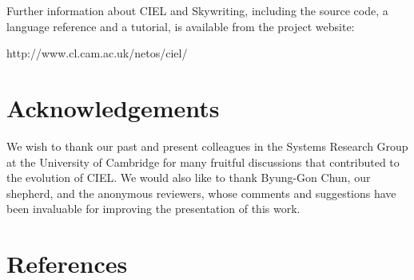 \documentclass[
]{article}
\begin{document}
Further information about CIEL and Skywriting, including the source
code, a language reference and a tutorial, is available from the project
website:

http://www.cl.cam.ac.uk/netos/ciel/

\section{Acknowledgements}\label{acknowledgements}

We wish to thank our past and present colleagues in the Systems Research
Group at the University of Cambridge for many fruitful discussions that
contributed to the evolution of CIEL. We would also like to thank
Byung-Gon Chun, our shepherd, and the anonymous reviewers, whose
comments and suggestions have been invaluable for improving the
presentation of this work.

\section{References}\label{references}
\end{document}
